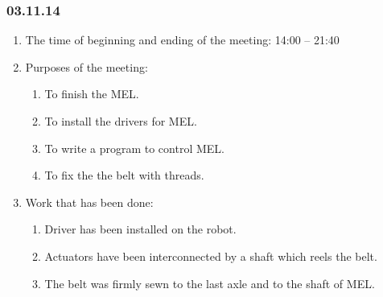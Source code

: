 \subsubsection{03.11.14}

\begin{enumerate}
	\item The time of beginning and ending of the meeting:
	14:00 – 21:40
	\item Purposes of the meeting:
	\begin{enumerate}
		\item To finish the MEL.
		
		\item To install the drivers for MEL.
		
		\item To write a program to control MEL.
		
		\item To fix the the belt with threads.
		
	\end{enumerate}
	
	\item Work that has been done:
	\begin{enumerate}
		\item Driver has been installed on the robot.
		
		\item Actuators have been interconnected by a shaft which reels the belt.
		
		\item The belt was firmly sewn to the last axle and to the shaft of MEL.
		

\end{enumerate}
\end{enumerate}
